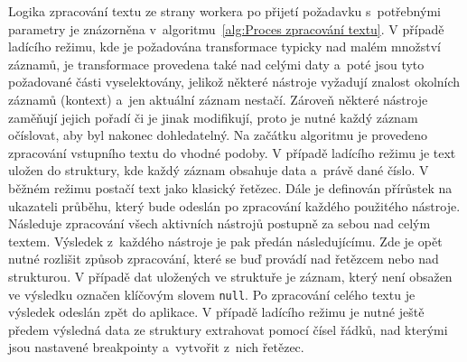 Logika zpracování textu ze strany workera po přijetí požadavku s~potřebnými parametry je znázorněna v~algoritmu~\ref{alg:Proces zpracování textu}. V případě ladícího režimu, kde je požadována transformace typicky nad malém množství záznamů, je transformace provedena také nad celými daty a~poté jsou tyto požadované části vyselektovány, jelikož některé nástroje vyžadují znalost okolních záznamů (kontext) a~jen aktuální záznam nestačí. Zároveň některé nástroje zaměňují jejich pořadí či je jinak modifikují, proto je nutné každý záznam očíslovat, aby byl nakonec dohledatelný. Na začátku algoritmu je provedeno zpracování vstupního textu do vhodné podoby. V případě ladícího režimu je text uložen do struktury, kde každý záznam obsahuje data a~právě dané číslo. V běžném režimu postačí text jako klasický řetězec. Dále je definován přírůstek na ukazateli průběhu, který bude odeslán po zpracování každého použitého nástroje. Následuje zpracování všech aktivních nástrojů postupně za sebou nad celým textem. Výsledek z~každého nástroje je pak předán následujícímu. Zde je opět nutné rozlišit způsob zpracování, které se buď provádí nad řetězcem nebo nad strukturou. V případě dat uložených ve struktuře je záznam, který není obsažen ve výsledku označen klíčovým slovem \texttt{null}. Po zpracování celého textu je výsledek odeslán zpět do aplikace. V případě ladícího režimu je nutné ještě předem výsledná data ze struktury extrahovat pomocí čísel řádků, nad kterými jsou nastavené breakpointy a~vytvořit z~nich řetězec.

